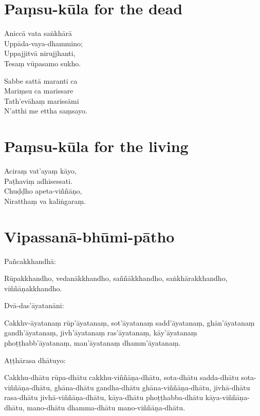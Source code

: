 \chapter{Paṃsu-kūla for the dead}%

\begin{paritta}
Aniccā vata saṅkhārā\\
Uppāda-vaya-dhammino;\\
Uppajjitvā nirujjhanti,\\
Tesaṃ vūpasamo sukho.

Sabbe sattā maranti ca\\
Mariṃsu ca marissare\\
Tath'evāhaṃ marissāmi\\
N'atthi me ettha saṃsayo.

\end{paritta}

\chapter{Paṃsu-kūla for the living}%

\begin{paritta}
Aciraṃ vat'ayaṃ kāyo,\\
Paṭhaviṃ adhisessati.\\
Chuḍḍho apeta-viññāṇo,\\
Niratthaṃ va kaliṅgaraṃ.

\end{paritta}

\clearpage

\chapter{Vipassanā-bhūmi-pātho}%

Pañcakkhandhā:

Rūpakkhandho, vedanākkhandho, saññākkhandho, saṅkhārakkhandho,
viññāṇakkhandho.

Dvā-das'āyatanāni:

Cakkhv-āyatanaṃ rūp'āyatanaṃ, sot'āyatanaṃ sadd'āyatanaṃ, ghān'āyatanaṃ
gandh'āyatanaṃ, jivh'āyatanaṃ ras'āyatanaṃ, kāy'āyatanaṃ
phoṭṭhabb'āyatanaṃ, man'āyatanaṃ dhamm'āyatanaṃ.

Aṭṭhārasa dhātuyo:

Cakkhu-dhātu rūpa-dhātu cakkhu-viññāṇa-dhātu, sota-dhātu sadda-dhātu
sota-viññāṇa-dhātu, ghāna-dhātu gandha-dhātu ghāna-viññāṇa-dhātu,
jivhā-dhātu rasa-dhātu jivhā-viññāṇa-dhātu, kāya-dhātu phoṭṭhabba-dhātu
kāya-viññāṇa-dhātu, mano-dhātu dhamma-dhātu mano-viññāṇa-dhātu.

